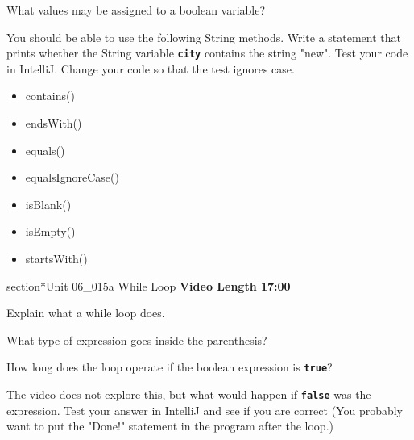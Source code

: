 \documentclass[letterpaper,12pt]{exam}
\newcommand{\unit}{Unit 06}
\begin{document}
\begin{questions}
\begin{samepage}
    \question What values may be assigned to a boolean variable?
    \vspace{5mm}
\end{samepage}

\begin{samepage}
    \question You should be able to use the following String methods.  
    \vspace{5mm}  Write a statement that prints whether the String variable \texttt{\textbf{city}} contains the string "new".  Test your code in IntelliJ.  Change your code so that the test ignores case.

\begin{itemize}
    \item contains()
    \item endsWith()
    \item equals()
    \item equalsIgnoreCase()
    \item isBlank()
    \item isEmpty()
    \item startsWith()
\end{itemize}
\end{samepage}

section*{\unit\_015a While Loop } %
\noindent \textbf{Video Length 17:00}

\begin{samepage}
    \question Explain what a while loop does.
    \vspace{5mm}
\end{samepage}

\begin{samepage}
    \question What type of expression goes inside the parenthesis?
    \vspace{5mm}
\end{samepage}

\begin{samepage}
    \question How long does the loop operate if the boolean expression is \texttt{\textbf{true}}?
    \vspace{5mm}
\end{samepage}

\begin{samepage}
    \question The video does not explore this, but what would happen if \texttt{\textbf{false}} was the expression.  Test your answer in IntelliJ and see if you are correct (You probably want to put the "Done!" statement in the program after the loop.)
    \vspace{5mm}
\end{samepage}


\end{questions}
\end{document}
